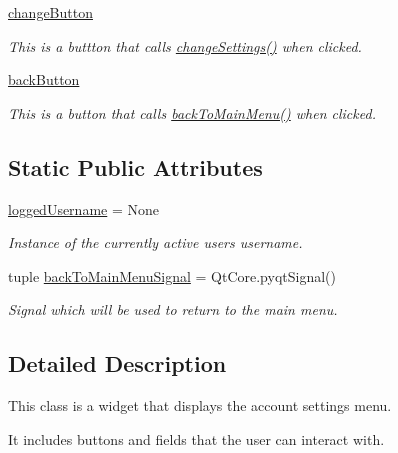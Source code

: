 \begin{DoxyCompactItemize}
\hyperlink{classsrc_1_1settings__menu_1_1_account_settings_menu_a6ad9267209290b0eaa3ef35191f81d82}{change\+Button}
\begin{DoxyCompactList}\small\item\em This is a buttton that calls \hyperlink{classsrc_1_1settings__menu_1_1_account_settings_menu_a10989536edbbe0db4fc03f2e5ccc8271}{change\+Settings()} when clicked. \end{DoxyCompactList}\item 
\hyperlink{classsrc_1_1settings__menu_1_1_account_settings_menu_a80552690cf6643721ebc00319289468a}{back\+Button}
\begin{DoxyCompactList}\small\item\em This is a button that calls \hyperlink{classsrc_1_1settings__menu_1_1_account_settings_menu_a47dc6e6cb8a9ca5431a32ad73298ed81}{back\+To\+Main\+Menu()} when clicked. \end{DoxyCompactList}\end{DoxyCompactItemize}
\subsection*{Static Public Attributes}
\begin{DoxyCompactItemize}
\item 
\hyperlink{classsrc_1_1settings__menu_1_1_account_settings_menu_a7cac3d6c4fd01c1d0c9e6cfcba8e8950}{logged\+Username} = None
\begin{DoxyCompactList}\small\item\em Instance of the currently active user\textquotesingle{}s username. \end{DoxyCompactList}\item 
tuple \hyperlink{classsrc_1_1settings__menu_1_1_account_settings_menu_a968b438c9430d659dcb90a23689127be}{back\+To\+Main\+Menu\+Signal} = Qt\+Core.\+pyqt\+Signal()
\begin{DoxyCompactList}\small\item\em Signal which will be used to return to the main menu. \end{DoxyCompactList}\end{DoxyCompactItemize}


\subsection{Detailed Description}
This class is a widget that displays the account settings menu. 

It includes buttons and fields that the user can interact with.~\newline
 

